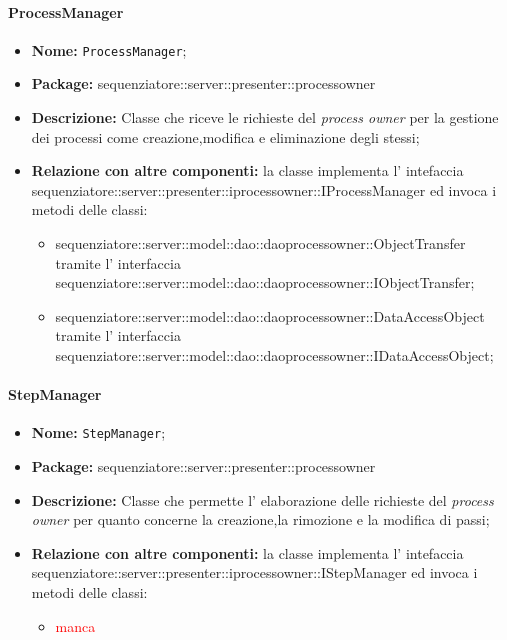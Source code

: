 \paragraph{ProcessManager}
	\begin{itemize}
		\item \textbf{Nome:} \texttt{ProcessManager};
		\item \textbf{Package:} sequenziatore::server::presenter::processowner
		\item \textbf{Descrizione:} Classe che riceve le richieste del \textit{process owner} per la gestione dei processi come creazione,modifica e eliminazione degli stessi;
		\item \textbf{Relazione con altre componenti:} la classe implementa l' intefaccia sequenziatore::server::presenter::iprocessowner::IProcessManager ed invoca i metodi delle classi:
		\begin{itemize}
			\item sequenziatore::server::model::dao::daoprocessowner::ObjectTransfer tramite l' interfaccia sequenziatore::server::model::dao::daoprocessowner::IObjectTransfer;
			\item sequenziatore::server::model::dao::daoprocessowner::DataAccessObject tramite l' interfaccia sequenziatore::server::model::dao::daoprocessowner::IDataAccessObject;
		\end{itemize}
	\end{itemize}
\paragraph{StepManager}
	\begin{itemize}
		\item \textbf{Nome:} \texttt{StepManager};
		\item \textbf{Package:} sequenziatore::server::presenter::processowner
		\item \textbf{Descrizione:} Classe che permette l' elaborazione delle richieste del \textit{process owner} per quanto concerne la creazione,la rimozione e la modifica di passi;
		\item \textbf{Relazione con altre componenti:} la classe implementa l' intefaccia sequenziatore::server::presenter::iprocessowner::IStepManager ed invoca i metodi delle classi:
		\begin{itemize}
			\item \textcolor{red}{manca}
		\end{itemize}
	\end{itemize}
